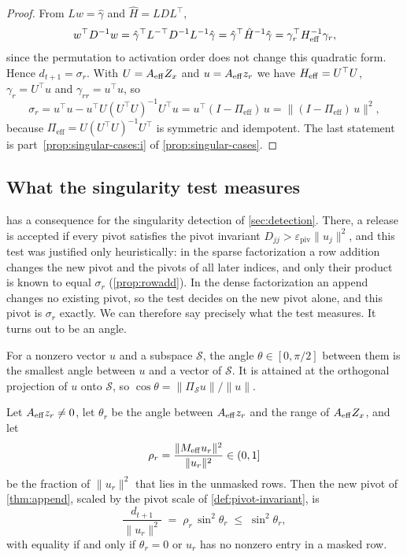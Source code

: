 \begin{proof}
From $Lw = \hat\gamma$ and $\hat H = LDL^\top$,
\[
w^\top D^{-1}w = \hat\gamma^\top L^{-\top}D^{-1}L^{-1}\hat\gamma = \hat\gamma^\top\hat H^{-1}\hat\gamma
= \gamma_r^\top H_{\mathrm{eff}}^{-1}\gamma_r ,
\]
since the permutation to activation order does not change this quadratic form. Hence
$d_{t+1} = \sigma_r$. With $U = A_{\mathrm{eff}} Z_x$ and $u = A_{\mathrm{eff}} z_r$ we have $H_{\mathrm{eff}} = U^\top U$,
$\gamma_r = U^\top u$ and $\gamma_{rr} = u^\top u$, so
\[
\sigma_r = u^\top u - u^\top U(U^\top U)^{-1}U^\top u = u^\top(I - \Pi_{\mathrm{eff}})\,u
= \lVert(I-\Pi_{\mathrm{eff}})\,u\rVert^2,
\]
because $\Pi_{\mathrm{eff}} = U(U^\top U)^{-1}U^\top$ is symmetric and idempotent. The last statement is
part~\ref{prop:singular-cases:i} of \cref{prop:singular-cases}.
\end{proof}

\subsection{What the singularity test measures}

 has a consequence for the singularity detection of
\cref{sec:detection}. There, a release is accepted if every pivot satisfies the pivot
invariant $D_{jj} > \varepsilon_{\mathrm{piv}}\lVert u_j\rVert^2$, and this test was justified only
heuristically: in the sparse factorization a row addition changes the new pivot and the pivots
of all later indices, and only their product is known to equal $\sigma_r$ (\cref{prop:rowadd}).
In the dense factorization an append changes no existing pivot, so the test decides on the new
pivot alone, and this pivot is $\sigma_r$ exactly. We can therefore say precisely what the test
measures. It turns out to be an angle.

For a nonzero vector $u$ and a subspace $\mathcal S$, the angle $\theta\in[0,\pi/2]$ between them is
the smallest angle between $u$ and a vector of $\mathcal S$. It is attained at the orthogonal
projection of $u$ onto $\mathcal S$, so $\cos\theta = \lVert\Pi_{\mathcal S}u\rVert/\lVert u\rVert$.

\begin{lemma} \label{lem:pivot-angle}
Let $A_{\mathrm{eff}} z_r\ne0$, let $\theta_r$ be the angle between $A_{\mathrm{eff}} z_r$ and the range of $A_{\mathrm{eff}} Z_x$, and
let
\[
\rho_r = \frac{\lVert M_{\mathrm{eff}} u_r\rVert^2}{\lVert u_r\rVert^2}\in(0,1]
\]
be the fraction of $\lVert u_r\rVert^2$ that lies in the unmasked rows. Then the new pivot of
\cref{thm:append}, scaled by the pivot scale of \cref{def:pivot-invariant}, is
\[
\frac{d_{t+1}}{\lVert u_r\rVert^2} \;=\; \rho_r\,\sin^2\theta_r \;\le\; \sin^2\theta_r ,
\]
with equality if and only if $\theta_r = 0$ or $u_r$ has no nonzero entry in a masked row.
\end{lemma}

